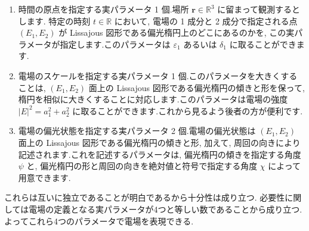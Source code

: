 \documentclass[uplatex,dvipdfmx,a4paper,11pt]{jlreq}
\newcommand{\RR}{\mathbb{R}}
\newcommand{\rr}{\bm{r}}
\theoremstyle{definition}
\begin{document}
\begin{enumerate}
  \item 時間の原点を指定する実パラメータ 1 個.場所 $\rr\in\RR^3$ に留まって観測するとします. 特定の時刻 $t\in\RR$ において, 電場の 1 成分と 2 成分で指定される点 $(E_1, E_2)$ が Lissajous 図形である偏光楕円上のどこにあるのかを, この実パラメータが指定します.このパラメータは $\varepsilon_1$ あるいは $\delta_1$ に取ることができます.
  \item 電場のスケールを指定する実パラメータ 1 個.このパラメータを大きくすることは, $(E_1, E_2)$ 面上の Lissajous 図形である偏光楕円の傾きと形を保って, 楕円を相似に大きくすることに対応します.このパラメータは電場の強度 $|E|^2 = a_1^2 + a_2^2$ に取ることができます.これから見るよう後者の方が便利です.
  \item 電場の偏光状態を指定する実パラメータ 2 個.電場の偏光状態は $(E_1, E_2)$ 面上の Lissajous 図形である偏光楕円の傾きと形, 加えて, 周回の向きにより記述されます.これを記述するパラメータは, 偏光楕円の傾きを指定する角度 $\psi$ と, 偏光楕円の形と周回の向きを絶対値と符号で指定する角度 $\chi$ によって用意できます.
\end{enumerate}

これらは互いに独立であることが明白であるから十分性は成り立つ. 必要性に関しては電場の定義となる実パラメータが4つと等しい数であることから成り立つ. よってこれら4つのパラメータで電場を表現できる.
\end{document}
